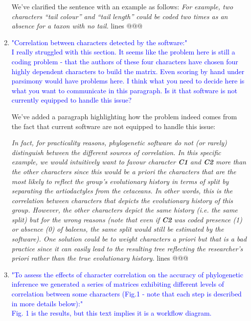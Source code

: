 \documentclass[12pt,letterpaper]{article}
\begin{document}
\begin{enumerate}

We've clarified the sentence with an example as follows:
\textit{For example, two characters ``tail colour'' and ``tail length'' could be coded two times as an absence for a taxon with no tail.} lines @@@

\item{\textcolor{blue}{"Correlation between characters detected by the software:"\\
I really struggled with this section. It seems like the problem here is still a coding problem - that the authors of these four characters have chosen four highly dependent characters to build the matrix. Even scoring by hand under parsimony would have problems here. I think what you need to decide here is what you want to communicate in this paragraph. Is it that software is not currently equipped to handle this issue?}}

We've added a paragraph highlighting how the problem indeed comes from the fact that current software are not equipped to handle this issue:

\textit{In fact, for practicality reasons, phylogenetic software do not (or rarely) distinguish between the different sources of correlation.
In this specific example, we would intuitively want to favour character \textbf{C1} and \textbf{C2} more than the other characters since this would be \textit{a priori} the characters that are the most likely to reflect the group's evolutionary history in terms of split by separating the artiodactyles from the cetaceans.
In other words, this is the correlation between characters that depicts the evolutionary history of this group.
However, the other characters depict the same history (i.e. the same split) but for the wrong reasons (note that even if \textbf{C2} was coded presence (1) or absence (0) of baleens, the same split would still be estimated by the software).
One solution could be to weight characters \textit{a priori} but that is a bad practice since it can easily lead to the resulting tree reflecting the researcher's \textit{priori} rather than the true evolutionary history.} lines @@@

\item{\textcolor{blue}{"To assess the effects of character correlation on the accuracy of phylogenetic inference we generated a series of matrices exhibiting different levels of correlation between some characters (Fig.1 - note that each step is described in more details below):"\\
Fig. 1 is the results, but this text implies it is a workflow diagram.}}


\end{enumerate}
\end{document}

